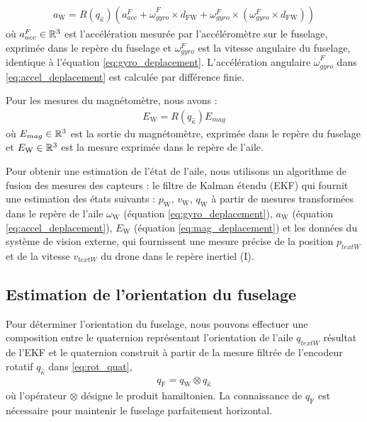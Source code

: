 \begin{align}
    \label{eq:accel_deplacement}
    a_{\text{W}} = R(q_{\hat{\kappa}}) \left( a_{acc}^{F} + \dot{\omega}_{gyro}^{F} \times d_{\text{FW}} + \omega_{gyro}^{F} \times ( \omega_{gyro}^{F} \times  d_{\text{FW}}) \right) 
\end{align}
où $a_{acc}^{F} \in {\mathbb R}^{3}$ est l'accélération mesurée par l'accéléromètre sur le fuselage, exprimée dans le repère du fuselage et $\omega_{gyro}^{F}$ est la vitesse angulaire du fuselage, identique à l'équation \eqref{eq:gyro_deplacement}. L'accélération angulaire $\dot{\omega}_{gyro}^{F}$ dans \eqref{eq:accel_deplacement} est calculée par différence finie.


Pour les mesures du magnétomètre, nous avons :
\begin{align}
    \label{eq:mag_deplacement}
    E_{\text{W}} = R(q_{\hat{\kappa}}) E_{mag}
\end{align}
où $E_{mag} \in {\mathbb R}^{3}$ est la sortie du magnétomètre, exprimée dans le repère du fuselage et $ E_{\text{W}} \in {\mathbb R}^{3}$ est la mesure exprimée dans le repère de l'aile.

Pour obtenir une estimation de l'état de l'aile, nous utilisons un algorithme de fusion des mesures des capteurs : le filtre de Kalman étendu (EKF)   qui fournit une estimation des états suivants : $p_{\text{W}}$, $v_{\text{W}}$, $q_{\text{W}}$ à partir de mesures transformées dans le repère de l'aile $\omega_{\text{W}}$ (équation \eqref{eq:gyro_deplacement}), $a_{\text{W}}$ (équation \eqref{eq:accel_deplacement}), $E_{\text{W}}$ (équation \eqref{eq:mag_deplacement}) et les données du système de vision externe, qui fournissent une mesure précise de la position $p_{text{W}}$ et de la vitesse $v_{text{W}}$ du drone dans le repère inertiel (I).


\subsection{Estimation de l'orientation du fuselage}
Pour déterminer l'orientation du fuselage, nous pouvons effectuer une composition entre le quaternion représentant l'orientation de l'aile $q_{text{W}}$ résultat de l'EKF et le quaternion construit à partir de la mesure filtrée de l'encodeur rotatif $q_{\hat{\kappa}}$ dans \eqref{eq:rot_quat},
\begin{align}
\label{eq:quat_fuselage}
    q_{\text{F}} = q_{\text{W}} \otimes q_{\hat{\kappa}}
\end{align}
où l'opérateur $\otimes$ désigne le produit hamiltonien. La connaissance de $q_{\text{F}}$ est nécessaire pour maintenir le fuselage parfaitement horizontal. 

